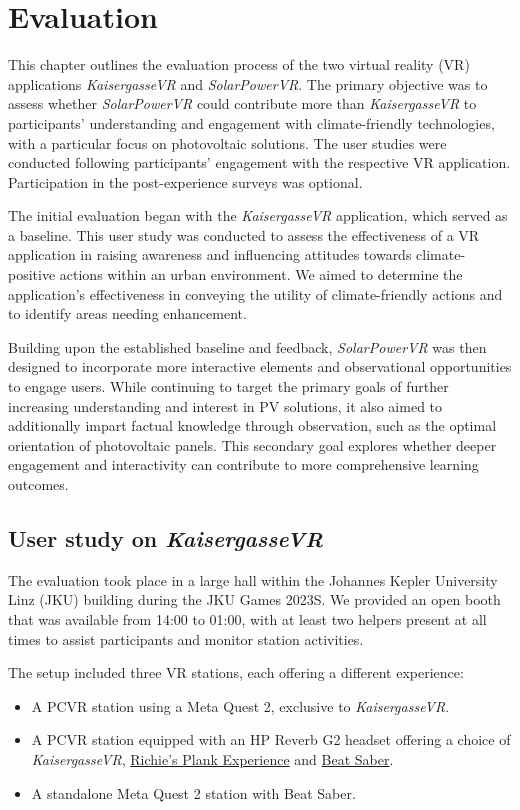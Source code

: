 \documentclass[draft, final]{vutinfth} %
\begin{document}
\chapter{Evaluation}

This chapter outlines the evaluation process of the two virtual reality (VR) applications \textit{KaisergasseVR} and \textit{SolarPowerVR}. The primary objective was to assess whether \textit{SolarPowerVR} could contribute more than \textit{KaisergasseVR} to participants' understanding and engagement with climate-friendly technologies, with a particular focus on photovoltaic solutions. The user studies were conducted following participants' engagement with the respective VR application. Participation in the post-experience surveys was optional.

The initial evaluation began with the \textit{KaisergasseVR} application, which served as a baseline. This user study was conducted to assess the effectiveness of a VR application in raising awareness and influencing attitudes towards climate-positive actions within an urban environment. We aimed to determine the application's effectiveness in conveying the utility of climate-friendly actions and to identify areas needing enhancement.

Building upon the established baseline and feedback, \textit{SolarPowerVR} was then designed to incorporate more interactive elements and observational opportunities to engage users. While continuing to target the primary goals of further increasing understanding and interest in PV solutions, it also aimed to additionally impart factual knowledge through observation, such as the optimal orientation of photovoltaic panels. This secondary goal explores whether deeper engagement and interactivity can contribute to more comprehensive learning outcomes.

\section{User study on \textit{KaisergasseVR}}
The evaluation took place in a large hall within the Johannes Kepler University Linz (JKU) building during the JKU Games 2023S.  We provided an open booth that was available from 14:00 to 01:00, with at least two helpers present at all times to assist participants and monitor station activities.

The setup included three VR stations, each offering a different experience:

\begin{itemize}
    \item A PCVR station using a Meta Quest 2, exclusive to \textit{KaisergasseVR}.
    \item A PCVR station equipped with an HP Reverb G2 headset offering a choice of \textit{KaisergasseVR}, \hyperlink{https://store.steampowered.com/app/517160/Richies_Plank_Experience/}{Richie's Plank Experience} and \hyperlink{https://store.steampowered.com/app/620980/Beat_Saber/}{Beat Saber}.
   \item A standalone Meta Quest 2 station with Beat Saber.
\end{itemize}
\end{document}
